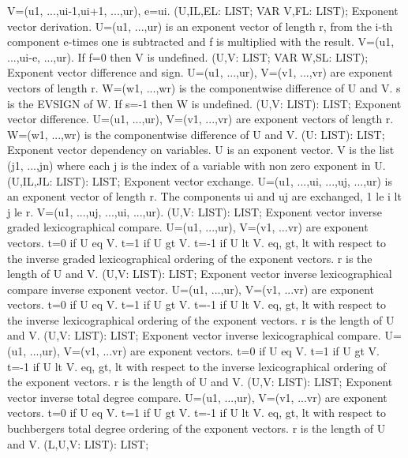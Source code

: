 V=(u1, ...,ui-1,ui+1, ...,ur), e=ui. \ecom 
{} (U,IL,EL: LIST; VAR V,FL: LIST); \eproc
\bcom Exponent vector derivation. U=(u1, ...,ur) is an exponent
vector of length r, from the i-th component e-times one is
subtracted and f is multiplied with the result.
V=(u1, ...,ui-e, ...,ur). If f=0 then V is undefined.  \ecom 
{} (U,V: LIST; VAR W,SL: LIST); \eproc
\bcom Exponent vector difference and sign. U=(u1, ...,ur),
V=(v1, ...,vr) are exponent vectors of length r.
W=(w1, ...,wr) is the componentwise difference of U and V.
s is the EVSIGN of W. If s=-1 then W is undefined. \ecom 
{} (U,V: LIST): LIST; \eproc
\bcom Exponent vector difference. U=(u1, ...,ur), V=(v1, ...,vr)
are exponent vectors of length r. W=(w1, ...,wr) is the
componentwise difference of U and V. \ecom 
{} (U: LIST): LIST; \eproc
\bcom Exponent vector dependency on variables. U is an exponent
vector. V is the list (j1, ...,jn) where each
j is the index of a variable with non zero exponent in U.  \ecom 
{} (U,IL,JL: LIST): LIST; \eproc
\bcom Exponent vector exchange. U=(u1, ...,ui, ...,uj, ...,ur)
is an exponent vector of length r. The components ui and uj are 
exchanged, 1 le i lt j le r. V=(u1, ...,uj, ...,ui, ...,ur). \ecom 
{} (U,V: LIST): LIST; \eproc
\bcom Exponent vector inverse graded lexicographical compare.
U=(u1, ...,ur), V=(v1, ...vr) are exponent vectors.
t=0 if U eq V. t=1 if U gt V. t=-1 if U lt V. eq, gt, lt
with respect to the inverse graded lexicographical ordering
of the exponent vectors. r is the length of U and V. \ecom 
{} (U,V: LIST): LIST; \eproc
\bcom Exponent vector inverse lexicographical compare inverse exponent vector.
U=(u1, ...,ur), V=(v1, ...vr) are exponent vectors.
t=0 if U eq V. t=1 if U gt V. t=-1 if U lt V. eq, gt,
lt with respect to the inverse lexicographical ordering
of the exponent vectors. r is the length of U and V. \ecom 
{} (U,V: LIST): LIST; \eproc
\bcom Exponent vector inverse lexicographical compare.
U=(u1, ...,ur), V=(v1, ...vr) are exponent vectors.
t=0 if U eq V. t=1 if U gt V. t=-1 if U lt V. eq, gt,
lt with respect to the inverse lexicographical ordering
of the exponent vectors. r is the length of U and V. \ecom 
{} (U,V: LIST): LIST; \eproc
\bcom Exponent vector inverse total degree compare.
U=(u1, ...,ur), V=(v1, ...vr) are exponent vectors.
t=0 if U eq V. t=1 if U gt V. t=-1 if U lt V. eq, gt, lt
with respect to buchbergers total degree ordering
of the exponent vectors. r is the length of U and V. \ecom 
{} (L,U,V: LIST): LIST; \eproc
